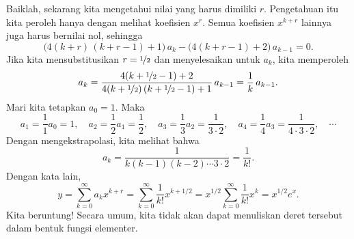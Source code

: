 \begin{example}
Baiklah, sekarang kita mengetahui nilai yang harus dimiliki $r$. Pengetahuan itu kita peroleh hanya dengan melihat
koefisien $x^r$. Semua
koefisien $x^{k+r}$ lainnya juga harus bernilai nol, sehingga
\begin{equation*}
\bigl( 4 (k+r)\,(k+r-1) + 1 \bigr) \, a_k
-
\bigl( 4 (k+r-1) + 2 \bigr) \, a_{k-1} = 0 .
\end{equation*}
Jika kita mensubstitusikan $r=\nicefrac{1}{2}$ dan menyelesaikan untuk $a_k$, kita memperoleh
\begin{equation*}
a_k
=
\frac{4 (k+\nicefrac{1}{2}-1) + 2}{4 (k+\nicefrac{1}{2})\,(k+\nicefrac{1}{2}-1) + 1} \, a_{k-1}
=
\frac{1}{k} \, a_{k-1} .
\end{equation*}
Mari kita tetapkan $a_0 = 1$. Maka
\begin{equation*}
a_1 = \frac{1}{1} a_0 = 1 ,
\quad
a_2 = \frac{1}{2} a_1 = \frac{1}{2} ,
\quad
a_3 = \frac{1}{3} a_2 = \frac{1}{3 \cdot 2} ,
\quad
a_4 = \frac{1}{4} a_3 = \frac{1}{4 \cdot 3 \cdot 2} ,
\quad \cdots
\end{equation*}
Dengan mengekstrapolasi, kita melihat bahwa
\begin{equation*}
a_k = \frac{1}{k(k-1)(k-2) \cdots 3 \cdot 2} = \frac{1}{k!} .
\end{equation*}
Dengan kata lain,
\begin{equation*}
y = 
\sum_{k=0}^\infty a_k x^{k+r}
=
\sum_{k=0}^\infty \frac{1}{k!} x^{k+1/2}
=
x^{1/2}
\sum_{k=0}^\infty \frac{1}{k!} x^{k}
=
x^{1/2}
e^x .
\end{equation*}
Kita beruntung! Secara umum, kita tidak akan dapat menuliskan deret tersebut dalam
bentuk fungsi elementer.


\end{example}
